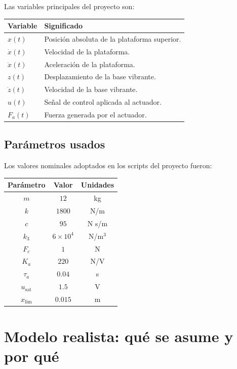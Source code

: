 \documentclass[11pt]{article}
\begin{document}
Las variables principales del proyecto son:

\begin{center}
\begin{tabular}{>{\raggedright\arraybackslash}p{3cm} p{10.2cm}}
\toprule
Variable & Significado \\
\midrule
$x(t)$ & Posici\'on absoluta de la plataforma superior. \\
$\dot{x}(t)$ & Velocidad de la plataforma. \\
$\ddot{x}(t)$ & Aceleraci\'on de la plataforma. \\
$z(t)$ & Desplazamiento de la base vibrante. \\
$\dot{z}(t)$ & Velocidad de la base vibrante. \\
$u(t)$ & Se\~nal de control aplicada al actuador. \\
$F_a(t)$ & Fuerza generada por el actuador. \\
\bottomrule
\end{tabular}
\end{center}

\subsection{Par\'ametros usados}

Los valores nominales adoptados en los scripts del proyecto fueron:

\begin{center}
\begin{tabular}{ccc}
\toprule
Par\'ametro & Valor & Unidades \\
\midrule
$m$ & $12$ & kg \\
$k$ & $1800$ & N/m \\
$c$ & $95$ & N s/m \\
$k_3$ & $6\times10^4$ & N/m$^3$ \\
$F_c$ & $1$ & N \\
$K_a$ & $220$ & N/V \\
$\tau_a$ & $0.04$ & s \\
$u_{\text{sat}}$ & $1.5$ & V \\
$x_{\text{lim}}$ & $0.015$ & m \\
\bottomrule
\end{tabular}
\end{center}

\section{Modelo realista: qu\'e se asume y por qu\'e}
\end{document}
